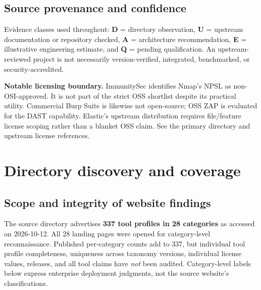 \documentclass[11pt,oneside]{report}
\begin{document}
\section{Source provenance and confidence}
Evidence classes used throughout: \textbf{D} = directory observation, \textbf{U} = upstream documentation or repository checked, \textbf{A} = architecture recommendation, \textbf{E} = illustrative engineering estimate, and \textbf{Q} = pending qualification. An upstream-reviewed project is not necessarily version-verified, integrated, benchmarked, or security-accredited.

\begin{caution}
\textbf{Notable licensing boundary.} ImmunitySec identifies Nmap's NPSL as non-OSI-approved\cite{immunity,nmap}. It is not part of the strict OSS shortlist despite its practical utility. Commercial Burp Suite is likewise not open-source; OSS ZAP is evaluated for the DAST capability. Elastic's upstream distribution requires file/feature license scoping rather than a blanket OSS claim. See the primary directory and upstream license references.
\end{caution}

\chapter{Directory discovery and coverage}
\section{Scope and integrity of website findings}
The source directory advertises \textbf{337 tool profiles in 28 categories}\cite{immunity} as accessed on 2026-10-12. All 28 landing pages were opened for category-level reconnaissance. Published per-category counts add to 337, but individual tool profile completeness, uniqueness across taxonomy versions, individual license values, releases, and all tool claims have \emph{not} been audited. Category-level labels below express enterprise deployment judgments, not the source website's classifications.
\end{document}
